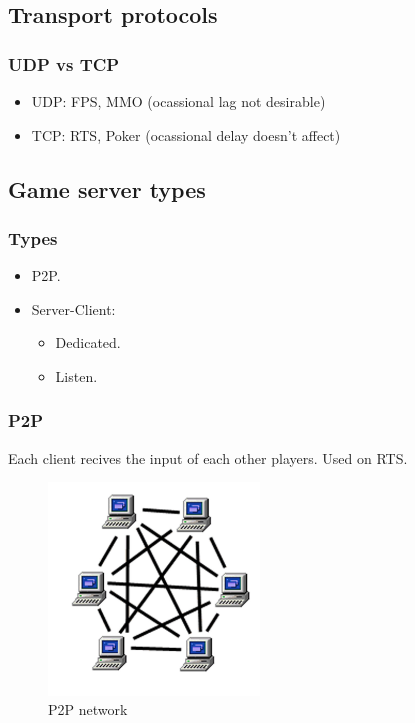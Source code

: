 \documentclass{beamer}
\begin{document}
\subsection{Transport protocols}
\begin{frame}
	\frametitle{UDP vs TCP}
	\begin{itemize}
		\item \alert{UDP}: FPS, MMO (ocassional lag not desirable)
		\item \alert{TCP}: RTS, Poker (ocassional delay doesn't affect)
	\end{itemize}
\end{frame}

\subsection{Game server types}
\begin{frame}
	\frametitle{Types}
	\begin{itemize}
		\item \alert{P2P}.
		\item \alert{Server-Client}: 
		\begin{itemize}
			\item Dedicated.
			\item Listen.
		\end{itemize}
	\end{itemize}
\end{frame}

\begin{frame}
	\frametitle{P2P}
	Each client recives the input of each other players. Used on RTS.
	\begin{figure}[H]
    	\centering
     \includegraphics[width=0.5\textwidth]{p2p.jpg}
     \caption{P2P network}
     \end{figure}
\end{frame}
\end{document}
